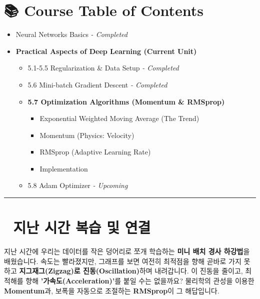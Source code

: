 \documentclass[11pt,a4paper]{book}
\theoremstyle{definition}
\begin{document}
\section*{📚 Course Table of Contents}
\begin{itemize}
    \item[Chapter 1-4.] Neural Networks Basics \textit{- Completed}
    \item[\textbf{Chapter 5.}] \textbf{Practical Aspects of Deep Learning (Current Unit)}
    \begin{itemize}
        \item 5.1-5.5 Regularization \& Data Setup \textit{- Completed}
        \item 5.6 Mini-batch Gradient Descent \textit{- Completed}
        \item \textbf{5.7 Optimization Algorithms (Momentum \& RMSprop)}
        \begin{itemize}
            \item Exponential Weighted Moving Average (The Trend)
            \item Momentum (Physics: Velocity)
            \item RMSprop (Adaptive Learning Rate)
            \item Implementation
        \end{itemize}
        \item 5.8 Adam Optimizer \textit{- Upcoming}
    \end{itemize}
\end{itemize}

\vspace{0.5cm}
\hrule
\vspace{0.5cm}

\section*{🔗 지난 시간 복습 및 연결}
지난 시간에 우리는 데이터를 작은 덩어리로 쪼개 학습하는 \textbf{미니 배치 경사 하강법}을 배웠습니다. 속도는 빨라졌지만, 그래프를 보면 여전히 최적점을 향해 곧바로 가지 못하고 \textbf{지그재그(Zigzag)로 진동(Oscillation)}하며 내려갑니다.
이 진동을 줄이고, 최적해를 향해 \textbf{'가속도(Acceleration)'}를 붙일 수는 없을까요? 물리학의 관성을 이용한 \textbf{Momentum}과, 보폭을 자동으로 조절하는 \textbf{RMSprop}이 그 해답입니다.

\end{document}
